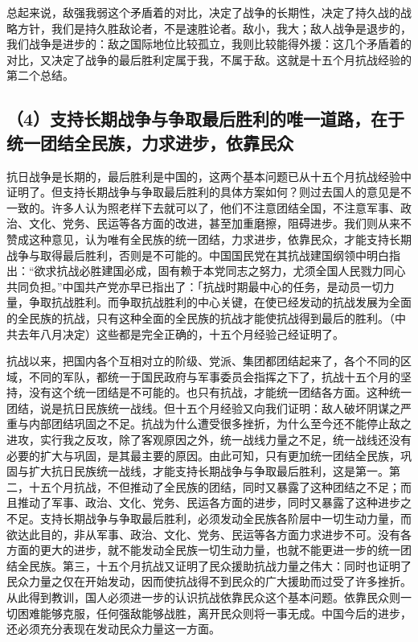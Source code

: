 总起来说，敌强我弱这个矛盾着的对比，决定了战争的长期性，决定了持久战的战略方针，我们是持久胜敌论者，不是速胜论者。敌小，我大；敌人战争是退步的，我们战争是进步的：敌之国际地位比较孤立，我则比较能得外援：这几个矛盾着的对比，又决定了战争的最后胜利定属于我，不属于敌。这就是十五个月抗战经验的第二个总结。

\subsection{（4）支持长期战争与争取最后胜利的唯一道路，在于统一团结全民族，力求进步，依靠民众}

抗日战争是长期的，最后胜利是中国的，这两个基本问题已从十五个月抗战经验中证明了。但支持长期战争与争取最后胜利的具体方案如何？则过去国人的意见是不一致的。许多人认为照老样下去就可以了，他们不注意团结全国，不注意军事、政治、文化、党务、民运等各方面的改进，甚至加重磨擦，阻碍进步。我们则从来不赞成这种意见，认为唯有全民族的统一团结，力求进步，依靠民众，才能支持长期战争与取得最后胜利，否则是不可能的。中国国民党在其抗战建国纲领中明白指出：“欲求抗战必胜建国必成，固有赖于本党同志之努力，尤须全国人民戮力同心共同负担。”中国共产党亦早已指出了：「抗战时期最中心的任务，是动员一切力量，争取抗战胜利。而争取抗战胜利的中心关键，在使已经发动的抗战发展为全面的全民族的抗战，只有这种全面的全民族的抗战才能使抗战得到最后的胜利。（中共去年八月决定）这些都是完全正确的，十五个月经验己经证明了。

抗战以来，把国内各个互相对立的阶级、党派、集团都团结起来了，各个不同的区域，不同的军队，都统一于国民政府与军事委员会指挥之下了，抗战十五个月的坚持，没有这个统一团结是不可能的。也只有抗战，才能统一团结各方面。这种统一团结，说是抗日民族统一战线。但十五个月经验又向我们证明：敌人破坏阴谋之严重与内部团结巩固之不足。抗战为什么遭受很多挫折，为什么至今还不能停止敌之进攻，实行我之反攻，除了客观原因之外，统一战线力量之不足，统一战线还没有必要的扩大与巩固，是其最主要的原因。由此可知，只有更加统一团结全民族，巩固与扩大抗日民族统一战线，才能支持长期战争与争取最后胜利，这是第一。第二，十五个月抗战，不但推动了全民族的团结，同时又暴露了这种团结之不足；而且推动了军事、政治、文化、党务、民运各方面的进步，同时又暴露了这种进步之不足。支持长期战争与争取最后胜利，必须发动全民族各阶层中一切生动力量，而欲达此目的，非从军事、政治、文化、党务、民运等各方面力求进步不可。没有各方面的更大的进步，就不能发动全民族一切生动力量，也就不能更进一步的统一团结全民族。第三，十五个月抗战又证明了民众援助抗战力量之伟大：同时也证明了民众力量之仅在开始发动，因而使抗战得不到民众的广大援助而过受了许多挫折。从此得到教训，国人必须进一步的认识抗战依靠民众这个基本问题。依靠民众则一切困难能够克服，任何强敌能够战胜，离开民众则将一事无成。中国今后的进步，还必须充分表现在发动民众力量这一方面。

